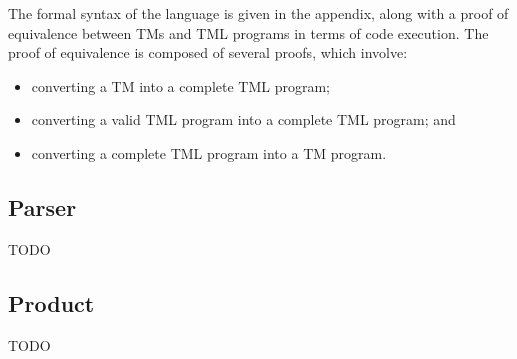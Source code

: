 The formal syntax of the language is given in the appendix, along with a proof of equivalence between TMs and TML programs in terms of code execution. The proof of equivalence is composed of several proofs, which involve:
\begin{itemize}
    \item converting a TM into a complete TML program;
    \item converting a valid TML program into a complete TML program; and
    \item converting a complete TML program into a TM program.
\end{itemize}

\subsection{Parser}
TODO

\subsection{Product}
TODO
